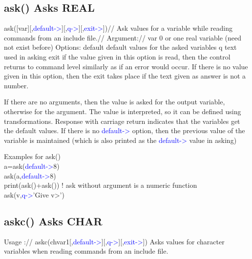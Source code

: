 \subsection{\textcolor{VioletRed}{ask}() Asks REAL}
\label{ask}
\textcolor{VioletRed}{ask}([var][,\textcolor{blue}{default->}][,\textcolor{blue}{q->}][,\textcolor{blue}{exit->}])//
Ask values for a variable while reading commands from an include file.//
Argument://
var 0 or one real variable (need not exist before)
Options:
default default values for the asked variables
q text used in asking
exit if the value given in this option is read, then the control returns to command level
similarly as if an error would occur. If there is no value given in this option, then
the exit takes place if the text given as answer is not a number.
\begin{note}
If there are no arguments, then the value is asked for the output variable, otherwise for
the argument. The value is interpreted, so it can be defined using transformations.
Response with carriage return indicates that the variables get the default values. If there is no
\textcolor{blue}{default->} option, then the previous value of the variable is maintained (which is also printed
as the \textcolor{blue}{default->} value in asking)
\end{note}

\begin{example}[askex]Examples for \textcolor{VioletRed}{ask}()\\
\label{askex}
a=\textcolor{VioletRed}{ask}(\textcolor{blue}{default->}8)\\
\textcolor{VioletRed}{ask}(a,\textcolor{blue}{default->}8)\\
\textcolor{VioletRed}{print}(\textcolor{VioletRed}{ask}()+\textcolor{VioletRed}{ask}()) ! ask without argument is a numeric function\\
\textcolor{VioletRed}{ask}(v,\textcolor{blue}{q->}'Give v>')
\end{example}
\subsection{\textcolor{VioletRed}{askc}() Asks CHAR}
\label{askc}
Usage ://
\textcolor{VioletRed}{askc}(chvar1[,\textcolor{blue}{default->}][,\textcolor{blue}{q->}][,\textcolor{blue}{exit->}])
Asks values for character variables when reading commands from an include file.


